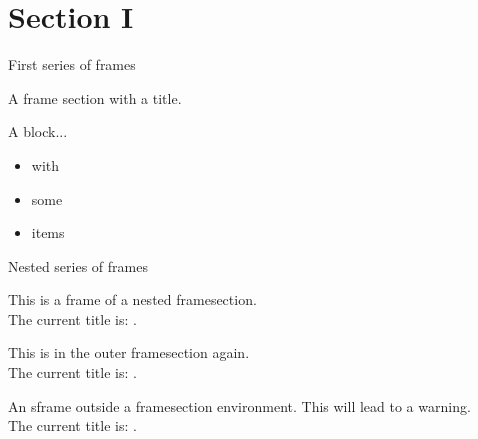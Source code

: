 \documentclass{beamer}
\begin{document}
\section*{Section I}

\begin{framesection}{First series of frames}
  \begin{sframe}
    A frame section with a title.
  \end{sframe}

  \begin{sframe}
    \begin{block}{A block...}
        \begin{itemize}
          \item with 
          \item some
          \item items
        \end{itemize}
    \end{block}
  \end{sframe}

  \begin{framesection}{Nested series of frames}
    \begin{sframe}
      This is a frame of a nested framesection.\\
      The current title is: \insertframesection.
    \end{sframe}
  \end{framesection}

  \begin{sframe}
    This is in the outer framesection again.\\
    The current title is: \insertframesection.
  \end{sframe}
\end{framesection}

\begin{sframe}
  An sframe outside a framesection environment.
  This will lead to a warning.\\
  The current title is: \insertframesection.
\end{sframe}
\end{document}
